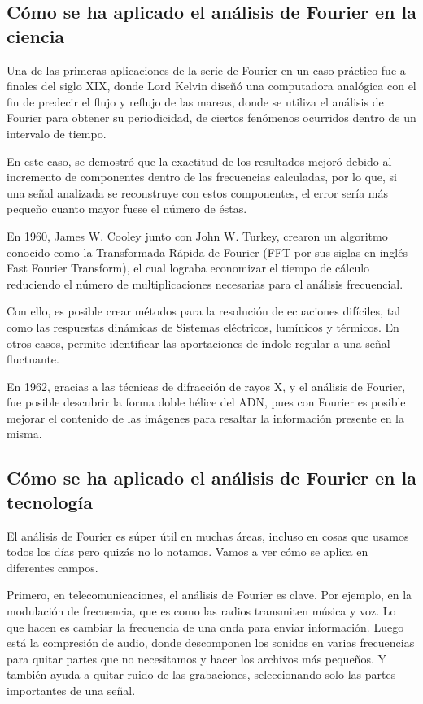 \subsection{Cómo se ha aplicado el análisis de Fourier en la ciencia}

Una de las primeras aplicaciones de la serie de Fourier en un caso práctico fue a finales del siglo XIX, donde Lord Kelvin diseñó una computadora analógica con el fin de predecir el flujo y reflujo de las mareas, donde se utiliza el análisis de Fourier para obtener su periodicidad, de ciertos fenómenos ocurridos dentro de un intervalo de tiempo.

En este caso, se demostró que la exactitud de los resultados mejoró debido al incremento de componentes dentro de las frecuencias calculadas, por lo que, si una señal analizada se reconstruye con estos componentes, el error sería más pequeño cuanto mayor fuese el número de éstas.

En 1960, James W. Cooley junto con John W. Turkey, crearon un algoritmo conocido como la Transformada Rápida de Fourier (FFT por sus siglas en inglés Fast Fourier Transform), el cual lograba economizar el tiempo de cálculo reduciendo el número de multiplicaciones necesarias para el análisis frecuencial.

Con ello, es posible crear métodos para la resolución de ecuaciones difíciles, tal como las respuestas dinámicas de Sistemas eléctricos, lumínicos y térmicos. En otros casos, permite identificar las aportaciones de índole regular a una señal fluctuante.

En 1962, gracias a las técnicas de difracción de rayos X, y el análisis de Fourier, fue posible descubrir la forma doble hélice del ADN, pues con Fourier es posible mejorar el contenido de las imágenes para resaltar la información presente en la misma.

\subsection{Cómo se ha aplicado el análisis de Fourier en la tecnología}

El análisis de Fourier es súper útil en muchas áreas, incluso en cosas que usamos todos los días pero quizás no lo notamos. Vamos a ver cómo se aplica en diferentes campos.

Primero, en telecomunicaciones, el análisis de Fourier es clave. Por ejemplo, en la modulación de frecuencia, que es como las radios transmiten música y voz. Lo que hacen es cambiar la frecuencia de una onda para enviar información. Luego está la compresión de audio, donde descomponen los sonidos en varias frecuencias para quitar partes que no necesitamos y hacer los archivos más pequeños. Y también ayuda a quitar ruido de las grabaciones, seleccionando solo las partes importantes de una señal.

